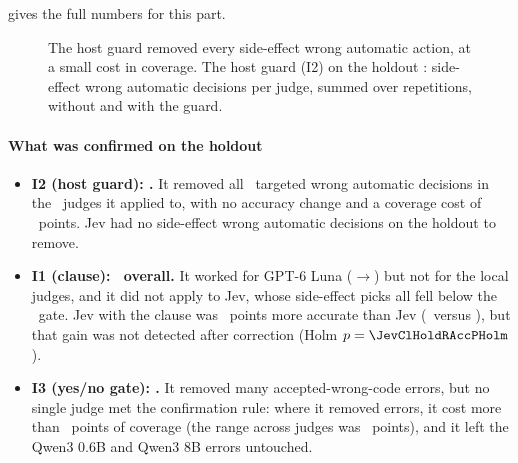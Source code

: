  gives the full numbers for this part.

\begin{table}[tbp]
\centering\small
\caption{Interventions on both splits. ``Targeted'' is the number of targeted wrong automatic decisions,
summed over the \HoldReps\ repetitions, before$\to$after. $\Delta$acc is the change in correct cases;
$\Delta$cov the change in coverage in percentage points. \ok\ marks an arm that meets the confirmation
rule on its own. Only arms where the intervention applies (at least one targeted error before) are
listed.}
\label{jb:tab:interventions}

\end{table}

\begin{figure}[tbp]
\centering

\caption{The host guard removed every side-effect wrong automatic action, at a small cost in coverage. The host guard (I2) on the holdout \prereg: side-effect wrong automatic decisions per judge,
summed over repetitions, without and with the guard.}
\label{jb:fig:i2}
\end{figure}

\paragraph{What was confirmed on the holdout}
\begin{itemize}
  \item \textbf{I2 (host guard): \ITwoHoldConfirmed.} It removed all \ITwoHoldBefore\ targeted wrong
    automatic decisions in the \ITwoHoldNApplicable\ judges it applied to, with no accuracy change and
    a coverage cost of \ITwoHoldCovCostRange\ points. Jev had no side-effect wrong automatic decisions
    on the holdout to remove.
  \item \textbf{I1 (clause): \IOneHoldConfirmed\ overall.} It worked for GPT-6 Luna
    (\IOneHoldLunaClBefore$\to$\IOneHoldLunaClAfter) but not for the local judges, and it did not apply to
    Jev, whose side-effect picks all fell below the \MinP\ gate. Jev with the clause was
    \JevClHoldRAccDiff\ points more accurate than Jev (\JevClHoldAccK\ versus \JevHoldAccK), but that
    gain was not detected after correction (Holm $p = \JevClHoldRAccPHolm$).
  \item \textbf{I3 (yes/no gate): \IThreeHoldConfirmed.} It removed many accepted-wrong-code errors, but no
    single judge met the confirmation rule: where it removed errors, it cost more than \IConfirmCovPts\
    points of coverage (the range across judges was \IThreeHoldCovCostRange\ points), and it left
    the Qwen3 0.6B and Qwen3 8B errors untouched.
\end{itemize}

